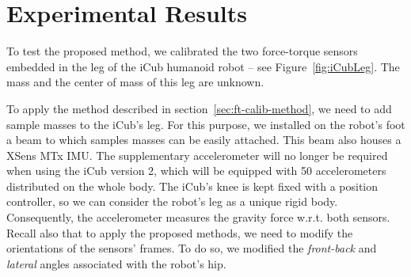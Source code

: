 \section{Experimental Results}
\label{sec:ft-calib-experiments}
To test the proposed method, we calibrated the two force-torque sensors embedded in the leg of the iCub humanoid robot 
-- see Figure~\ref{fig:iCubLeg}. The mass and the center of mass of this leg are unknown.

To apply the method described in section~\ref{sec:ft-calib-method}, we need to add sample masses to the iCub's leg.
For this purpose, we installed on the robot's foot a beam to which samples masses can be easily attached. This beam also houses a XSens MTx IMU.
The supplementary accelerometer will no longer be required when using
 the iCub version 2, which will be equipped with 50 accelerometers 
distributed on the whole body. 
The iCub's knee is kept fixed with a position controller, so we can consider the robot's leg as a unique rigid body.
Consequently, the accelerometer measures the gravity force w.r.t. both sensors.  Recall also that 
to apply the proposed methods, we need to modify the orientations of the sensors' frames. To do so, we modified the \emph{front-back} and
\emph{lateral} angles associated with the robot's hip. 



